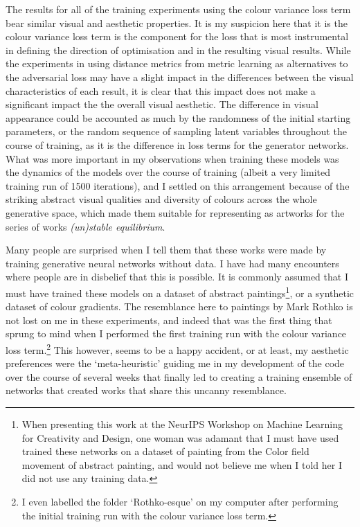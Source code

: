 The results for all of the training experiments using the colour variance loss term bear similar visual and aesthetic properties. 
It is my suspicion here that it is the colour variance loss term is the component for the loss that is most instrumental in defining the direction of optimisation and in the resulting visual results.
While the experiments in using distance metrics from metric learning as alternatives to the adversarial loss may have a slight impact in the differences between the visual characteristics of each result, it is clear that this impact does not make a significant impact the the overall visual aesthetic.
The difference in visual appearance could be accounted as much by the randomness of the initial starting parameters, or the random sequence of sampling latent variables throughout the course of training, as it is the difference in loss terms for the generator networks.
What was more important in my observations when training these models was the dynamics of the models over the course of training (albeit a very limited training run of 1500 iterations), and I settled on this arrangement because of the striking abstract visual qualities and diversity of colours across the whole generative space, which made them suitable for representing as artworks for the series of works \textit{(un)stable equilibrium}. 

Many people are surprised when I tell them that these works were made by training generative neural networks without data.
I have had many encounters where people are in disbelief that this is possible. It is commonly assumed that I must have trained these models on a dataset of abstract paintings\footnote{When presenting this work at the NeurIPS Workshop on Machine Learning for Creativity and Design, one woman was adamant that I must have used trained these networks on a dataset of painting from the Color field movement of abstract painting, and would not believe me when I told her I did not use any training data.}, or a synthetic dataset of colour gradients. 
The resemblance here to paintings by Mark Rothko is not lost on me in these experiments, and indeed that was the first thing that sprung to mind when I performed the first training run with the colour variance loss term.\footnote{I even labelled the folder `Rothko-esque' on my computer after performing the initial training run with the colour variance loss term.} 
This however, seems to be a happy accident, or at least, my aesthetic preferences were the `meta-heuristic' guiding me in my development of the code over the course of several weeks that finally led to creating a training ensemble of networks that created works that share this uncanny resemblance.

